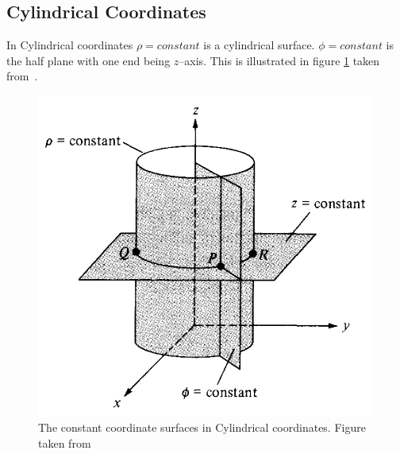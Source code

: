 \documentclass[12pt,a4paper]{article}
\begin{document}
\subsection{Cylindrical Coordinates}
In Cylindrical coordinates $\rho=constant$ is a cylindrical surface. $\phi=constant$ is the half plane with one end being $z$--axis. This is illustrated in figure \ref{Cylindrical-constant} taken from~\cite[Figure 2.8, page 43]{Sadiku}.
\begin{figure}[H]
\centering
\includegraphics[scale=0.4]{Figure2-8S.png}
\caption{The constant coordinate surfaces in Cylindrical coordinates. Figure taken from~\cite[Figure 2.8, page 43]{Sadiku}}
\label{Cylindrical-constant}
\end{figure}
\end{document}
